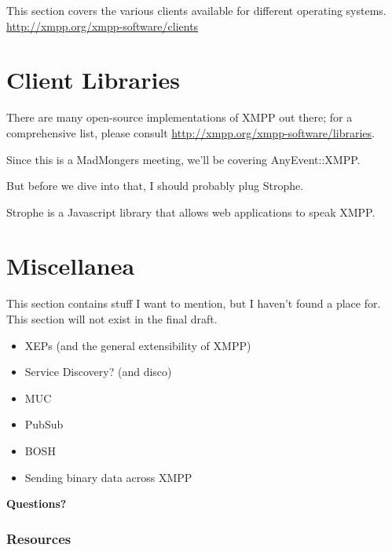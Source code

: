 \documentclass{article}
\begin{document}
\newpage
This section covers the various clients available for different operating systems.
\url{http://xmpp.org/xmpp-software/clients}

\newpage
\part{Client Libraries}

\newpage
There are many open-source implementations of XMPP out there; for a comprehensive list,
please consult \url{http://xmpp.org/xmpp-software/libraries}.

\newpage
Since this is a MadMongers meeting, we'll be covering AnyEvent::XMPP.

\newpage
But before we dive into that, I should probably plug Strophe.

\newpage
Strophe is a Javascript library that allows web applications to speak XMPP.

\newpage
\part{Miscellanea}

\newpage
This section contains stuff I want to mention, but I haven't found a place for.
This section will not exist in the final draft.

\newpage
\begin{itemize}
\item XEPs (and the general extensibility of XMPP)
\item Service Discovery? (and disco)
\item MUC
\item PubSub
\item BOSH
\item Sending binary data across XMPP
\end{itemize}

\newpage

\vspace*{\fill}
\begin{center}
\textbf{\Huge Questions?}
\end{center}
\vspace*{\fill}

\newpage
\appendix
\section{Resources}
\end{document}
